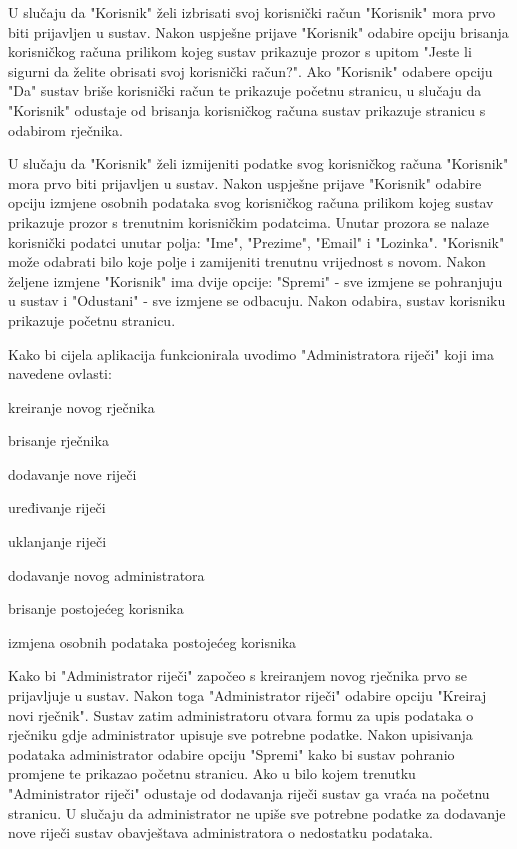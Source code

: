 U slučaju da "Korisnik" želi izbrisati svoj korisnički račun "Korisnik" mora prvo biti prijavljen u sustav. Nakon uspješne prijave "Korisnik" odabire opciju brisanja korisničkog računa prilikom kojeg sustav prikazuje prozor s upitom "Jeste li sigurni da želite obrisati svoj korisnički račun?". Ako "Korisnik" odabere opciju "Da" sustav briše korisnički račun te prikazuje početnu stranicu, u slučaju da "Korisnik" odustaje od brisanja korisničkog računa sustav prikazuje stranicu s odabirom rječnika.

U slučaju da "Korisnik" želi izmijeniti podatke svog korisničkog računa "Korisnik" mora prvo biti prijavljen u sustav. Nakon uspješne prijave "Korisnik" odabire opciju izmjene osobnih podataka svog korisničkog računa prilikom kojeg sustav prikazuje prozor s trenutnim korisničkim podatcima. Unutar prozora se nalaze korisnički podatci unutar polja: "Ime", "Prezime", "Email" i "Lozinka". "Korisnik" može odabrati bilo koje polje i zamijeniti trenutnu vrijednost s novom. Nakon željene izmjene "Korisnik" ima dvije opcije: "Spremi" - sve izmjene se pohranjuju u sustav i "Odustani" - sve izmjene se odbacuju. Nakon odabira, sustav korisniku prikazuje početnu stranicu.

Kako bi cijela aplikacija funkcionirala uvodimo "Administratora riječi" koji ima navedene ovlasti:

\begin{packed_item}
	\item  kreiranje novog rječnika
	\item  brisanje rječnika
	\item  dodavanje nove riječi
	\item  uređivanje riječi
	\item  uklanjanje riječi
	\item  dodavanje novog administratora
	\item  brisanje postojećeg korisnika
	\item  izmjena osobnih podataka postojećeg korisnika
\end{packed_item}

Kako bi "Administrator riječi" započeo s kreiranjem novog rječnika prvo se prijavljuje u sustav. Nakon toga "Administrator riječi" odabire opciju "Kreiraj novi rječnik". Sustav zatim administratoru otvara formu za upis podataka o rječniku gdje administrator upisuje sve potrebne podatke. Nakon upisivanja podataka administrator odabire opciju "Spremi" kako bi sustav pohranio promjene te prikazao početnu stranicu. Ako u bilo kojem trenutku "Administrator riječi" odustaje od dodavanja riječi sustav ga vraća na početnu stranicu. U slučaju da administrator ne upiše sve potrebne podatke za dodavanje nove riječi sustav obavještava administratora o nedostatku podataka.

